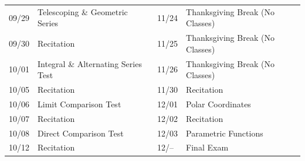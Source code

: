 \documentclass[11pt,letterpaper]{article}
\begin{document}
\begin{table}[!ht]
{\begin{tabular}{ll || ll}
	09/29 & Telescoping \& Geometric Series & 11/24 & Thanksgiving Break (No Classes) \\
	09/30 & Recitation & 11/25 & Thanksgiving Break (No Classes) \\
	10/01 & Integral \& Alternating Series Test & 11/26 & Thanksgiving Break (No Classes) \\
	10/05 & Recitation & 11/30 & Recitation \\
	10/06 & Limit Comparison Test & 12/01 & Polar Coordinates \\
	10/07 & Recitation & 12/02 & Recitation \\
	10/08 & Direct Comparison Test & 12/03 & Parametric Functions \\
	10/12 & Recitation & 12/-- & Final Exam
        \end{tabular}
        }
        \end{table}
\end{document}
